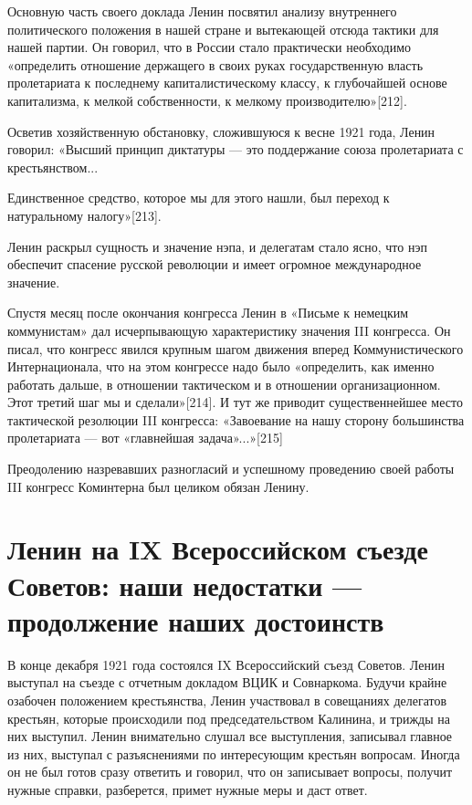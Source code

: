\documentclass[12pt, a4paper, openany]{book}
\begin{document}
Основную часть своего доклада Ленин посвятил анализу внутреннего политического положения в нашей стране и вытекающей отсюда тактики для нашей партии. Он говорил, что в России стало практически необходимо «определить отношение держащего в своих руках государственную власть пролетариата к последнему капиталистическому классу, к глубочайшей основе капитализма, к мелкой собственности, к мелкому производителю»[212].

Осветив хозяйственную обстановку, сложившуюся к весне 1921 года, Ленин говорил: «Высший принцип диктатуры — это поддержание союза пролетариата с крестьянством...

Единственное средство, которое мы для этого нашли, был переход к натуральному налогу»[213].

Ленин раскрыл сущность и значение нэпа, и делегатам стало ясно, что нэп обеспечит спасение русской революции и имеет огромное международное значение.

Спустя месяц после окончания конгресса Ленин в «Письме к немецким коммунистам» дал исчерпывающую характеристику значения III конгресса. Он писал, что конгресс явился крупным шагом движения вперед Коммунистического Интернационала, что на этом конгрессе надо было «определить, как именно работать дальше, в отношении тактическом и в отношении организационном. Этот третий шаг мы и сделали»[214]. И тут же приводит существеннейшее место тактической резолюции III конгресса: «Завоевание на нашу сторону большинства пролетариата — вот «главнейшая задача»...»[215]

Преодолению назревавших разногласий и успешному проведению своей работы III конгресс Коминтерна был целиком обязан Ленину.

\newpage
\section[Ленин на IX Всероссийском съезде Советов: наши недостатки — продолжение наших достоинств]{\center \textbf{Ленин на IX Всероссийском съезде Советов: наши недостатки — продолжение наших достоинств}}


В конце декабря 1921 года состоялся IX Всероссийский съезд Советов. Ленин выступал на съезде с отчетным докладом ВЦИК и Совнаркома. Будучи крайне озабочен положением крестьянства, Ленин участвовал в совещаниях делегатов крестьян, которые происходили под председательством Калинина, и трижды на них выступил. Ленин внимательно слушал все выступления, записывал главное из них, выступал с разъяснениями по интересующим крестьян вопросам. Иногда он не был готов сразу ответить и говорил, что он записывает вопросы, получит нужные справки, разберется, примет нужные меры и даст ответ.
\end{document}
